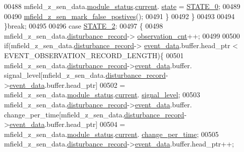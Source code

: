 \begin{DoxyCode}
00488                          mfield\_z\_sen\_data.\hyperlink{a00027_adfab5a5d8b45a93dfb13edb24e2b80e3}{module\_status}.\hyperlink{a00019_acf41ffc11da291c2f9f0fcb02ee72b98}{current}.
      \hyperlink{a00019_a6b8d8e916bc56265a3fd279bd26b6d1b}{state} = \hyperlink{a00021_ad6739dbbe5581cac99b7dc8a5e09949c}{STATE\_0};
00489 
00490                          \hyperlink{a00053_acd2adf617d062b1d3dfc9df79aa2ad32}{mfield\_z\_sen\_mark\_false\_postives}();
00491                     \}
00492              \}
00493 
00494         \}\textcolor{keywordflow}{break};
00495 
00496          \textcolor{keywordflow}{case} \hyperlink{a00021_a66fa48e832a64af4d405511cecc4c752}{STATE\_2}: 
00497         \{
00498             mfield\_z\_sen\_data.\hyperlink{a00027_ac9b38e2c1d3f1013a88d33506c754152}{disturbance\_record}->
      \hyperlink{a00028_ad5b0bac02ce266b91b2b52a1c3ea1d78}{observation\_cnt}++;
00499 
00500             \textcolor{keywordflow}{if}(mfield\_z\_sen\_data.\hyperlink{a00027_ac9b38e2c1d3f1013a88d33506c754152}{disturbance\_record}->
      \hyperlink{a00028_a8c0bda69e71ef674e60da47ad0be9ab0}{event\_data}.buffer.head\_ptr < EVENT\_OBSERVATION\_RECORD\_LENGTH)\{
00501             mfield\_z\_sen\_data.\hyperlink{a00027_ac9b38e2c1d3f1013a88d33506c754152}{disturbance\_record}->\hyperlink{a00028_a8c0bda69e71ef674e60da47ad0be9ab0}{event\_data}.buffer.
      signal\_level[mfield\_z\_sen\_data.\hyperlink{a00027_ac9b38e2c1d3f1013a88d33506c754152}{disturbance\_record}->\hyperlink{a00028_a8c0bda69e71ef674e60da47ad0be9ab0}{event\_data}.buffer.head\_ptr]
00502                     = mfield\_z\_sen\_data.\hyperlink{a00027_adfab5a5d8b45a93dfb13edb24e2b80e3}{module\_status}.\hyperlink{a00019_acf41ffc11da291c2f9f0fcb02ee72b98}{current}.
      \hyperlink{a00019_a4070db8eab0ff93e3fbc1df59872f117}{signal\_level};
00503             mfield\_z\_sen\_data.\hyperlink{a00027_ac9b38e2c1d3f1013a88d33506c754152}{disturbance\_record}->\hyperlink{a00028_a8c0bda69e71ef674e60da47ad0be9ab0}{event\_data}.buffer.
      change\_per\_time[mfield\_z\_sen\_data.\hyperlink{a00027_ac9b38e2c1d3f1013a88d33506c754152}{disturbance\_record}->\hyperlink{a00028_a8c0bda69e71ef674e60da47ad0be9ab0}{event\_data}.buffer.head\_ptr]
00504                     = mfield\_z\_sen\_data.\hyperlink{a00027_adfab5a5d8b45a93dfb13edb24e2b80e3}{module\_status}.\hyperlink{a00019_acf41ffc11da291c2f9f0fcb02ee72b98}{current}.
      \hyperlink{a00019_a0f645dd76b41adc6a966feba8e4bff8c}{change\_per\_time};
00505             mfield\_z\_sen\_data.\hyperlink{a00027_ac9b38e2c1d3f1013a88d33506c754152}{disturbance\_record}->\hyperlink{a00028_a8c0bda69e71ef674e60da47ad0be9ab0}{event\_data}.buffer.head\_ptr++;

\end{DoxyCode}
